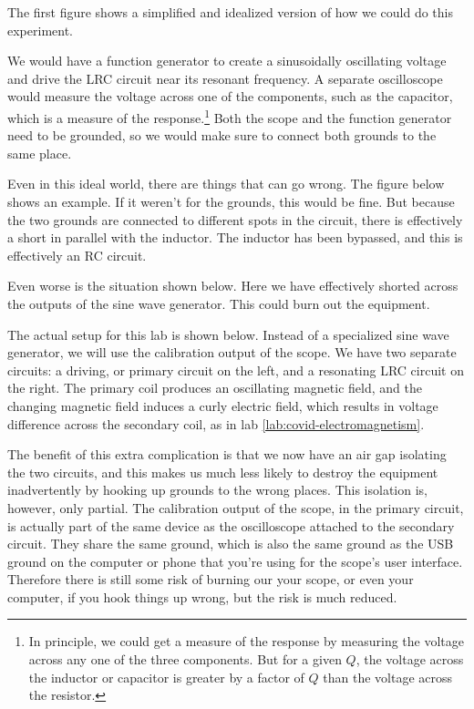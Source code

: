 The first figure shows a simplified and idealized version of how we could
do this experiment.


We would have a function generator to create a sinusoidally oscillating
voltage and drive the LRC circuit near its resonant frequency. A separate
oscilloscope would measure the voltage across one of the components, such as
the capacitor, which is a measure of the response.\footnote{In principle, we
could get a measure of the response by measuring the voltage across any one
of the three components. But for a given $Q$, the voltage across the inductor or
capacitor is greater by a factor of $Q$ than the voltage across the resistor.}
Both the scope and the function generator need to be grounded, so we would
make sure to connect both grounds to the same place.

Even in this ideal world, there are things that can go wrong. The figure
below shows an example. If it weren't for the grounds, this would be
fine. But because the two grounds are connected to different spots in
the circuit, there is effectively a short in parallel with the inductor.
The inductor has been bypassed, and this is effectively an RC circuit.


Even worse is the situation shown below. Here we have effectively shorted
across the outputs of the sine wave generator. This could burn out the
equipment.


The actual setup for this lab is shown below. Instead of a specialized
sine wave generator, we will use the calibration output of the scope.
We have two separate circuits: a driving, or primary circuit on the left,
and a resonating LRC circuit on the right. The primary coil produces an
oscillating magnetic field, and the changing magnetic field induces
a curly electric field, which results in voltage difference across
the secondary coil, as in lab \ref{lab:covid-electromagnetism}.


The benefit of this extra complication is that we now have an air gap
isolating the two circuits, and this makes us much less likely to destroy
the equipment inadvertently by hooking up grounds to the wrong places.
This isolation is, however, only partial. The calibration output of the
scope, in the primary circuit, is actually part of the same device as the
oscilloscope attached to the secondary circuit. They share the same ground,
which is also the same ground as the USB ground on the computer or phone that
you're using for the scope's user interface. Therefore there is still some
risk of burning our your scope, or even your computer, if you hook things
up wrong, but the risk is much reduced.


